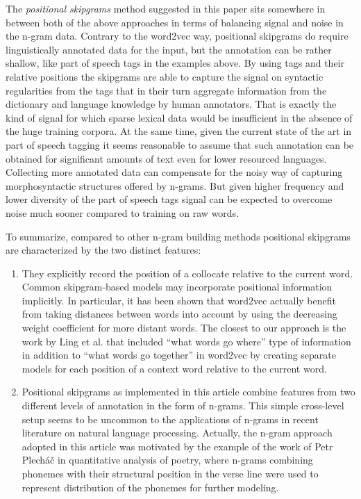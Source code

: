 \documentclass[12pt]{article}
\begin{document}
The \textit{positional skipgrams} method suggested in this paper sits
somewhere in between both of the above approaches in terms of
balancing signal and noise in the n-gram data. Contrary to the
word2vec way, positional skipgrams do require linguistically annotated
data for the input, but the annotation can be rather shallow, like
part of speech tags in the examples above.  By using tags and their
relative positions the skipgrams are able to capture the signal on
syntactic regularities from the tags that in their turn aggregate
information from the dictionary and language knowledge by human
annotators. That is exactly the kind of signal for which sparse
lexical data would be insufficient in the absence of the huge training
corpora. At the same time, given the current state of the art in part
of speech tagging it seems reasonable to assume that such annotation
can be obtained for significant amounts of text even for lower
resourced languages. Collecting more annotated data can compensate for
the noisy way of capturing morphosyntactic structures offered by
n-grams. But given higher frequency and lower diversity of the part of
speech tags signal can be expected to overcome noise much sooner
compared to training on raw words.

To summarize, compared to other n-gram building methods positional
skipgrams are characterized by the two distinct features:

\begin{enumerate}
\item They explicitly record the position of a collocate relative to
  the current word. Common skipgram-based models may incorporate
  positional information implicitly. In particular, it has been shown
  that word2vec actually benefit from taking distances between words
  into account by using the decreasing weight coefficient for more
  distant words. The closest to our approach
  is the work by Ling et al. that included “what words go where” type
  of information in addition to “what words go together” in word2vec
  by creating separate models for each position of a context word
  relative to the current word.
\item Positional skipgrams as implemented in this article combine
  features from two different levels of annotation in the form of
  n-grams. This simple cross-level setup seems to be uncommon to the
  applications of n-grams in recent literature on natural language
  processing. Actually, the n-gram approach adopted in this article
  was motivated by the example of the work of Petr Plech\'a\v{c} in
  quantitative analysis of poetry, where n-grams combining phonemes with
  their structural position in the verse line were used to represent
  distribution of the phonemes for further modeling.
\end{enumerate}
\end{document}
